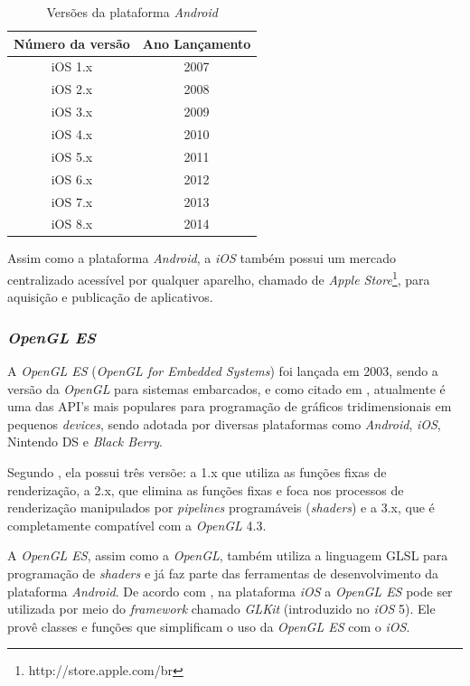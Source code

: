 	\begin{table}[ht]
	\centering	
	\begin{tabular}{cc}
		\toprule
		\textbf{Número da versão} & Ano Lançamento  \\
		\midrule
		iOS 1.x & 2007 \\
		iOS 2.x & 2008 \\
		iOS 3.x &  2009 \\
		iOS 4.x & 2010 \\
		iOS 5.x &  2011 \\
		iOS 6.x & 2012 \\
		iOS 7.x & 2013 \\
		iOS 8.x & 2014 \\	
		\bottomrule
	\end{tabular}
	\caption{ Versões da plataforma \textit{Android}}
	\label{iosv}
\end{table}

	Assim como a plataforma \textit{Android}, a \textit{iOS} também possui um mercado centralizado acessível por qualquer aparelho, chamado de \textit{Apple Store}\footnote{http://store.apple.com/br}, para aquisição e publicação de aplicativos. 

	\subsubsection{\textit{OpenGL ES}}
	
	A \textit{OpenGL ES} (\textit{OpenGL for Embedded Systems}) foi lançada em 2003, sendo a versão da \textit{OpenGL} para sistemas embarcados, e como citado em \cite{guha2011}, atualmente é uma das API's mais populares para programação de gráficos tridimensionais em pequenos \textit{devices}, sendo adotada por diversas plataformas como \textit{Android}, \textit{iOS}, Nintendo DS e \textit{Black Berry}.

	Segundo \cite{opengles2012}, ela possui três versõe: a 1.x que utiliza as funções fixas de renderização, a 2.x, que elimina as funções fixas e foca nos processos de renderização manipulados por \textit{pipelines} programáveis (\textit{shaders}) e a 3.x, que é completamente compatível com a  \textit{OpenGL} 4.3.  

	A \textit{OpenGL ES}, assim como a \textit{OpenGL}, também utiliza a linguagem GLSL para programação de \textit{shaders} e  já faz parte das ferramentas de desenvolvimento da plataforma \textit{Android}. De acordo com \cite{buck2012}, na plataforma \textit{iOS} a \textit{OpenGL ES} pode ser utilizada por meio do \textit{framework} chamado \textit{GLKit} (introduzido no \textit{iOS} 5). Ele provê classes e funções que simplificam o uso da \textit{OpenGL ES} com o \textit{iOS}.


